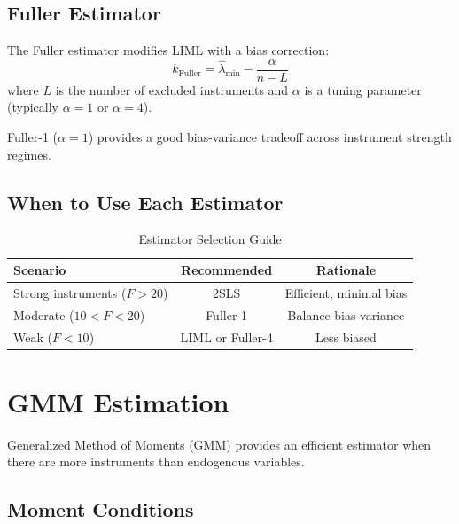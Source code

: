\subsection{Fuller Estimator}

\begin{definition}
\label{def:fuller}
The Fuller estimator modifies LIML with a bias correction:
\begin{equation}
k_{\text{Fuller}} = \hat{\lambda}_{\min} - \frac{\alpha}{n - L}
\end{equation}
where $L$ is the number of excluded instruments and $\alpha$ is a tuning parameter (typically $\alpha = 1$ or $\alpha = 4$).
\end{definition}

Fuller-1 ($\alpha = 1$) provides a good bias-variance tradeoff across instrument strength regimes.

\subsection{When to Use Each Estimator}

\begin{table}[ht]
\centering
\caption{Estimator Selection Guide}
\begin{tabular}{lcc}
\toprule
\textbf{Scenario} & \textbf{Recommended} & \textbf{Rationale} \\
\midrule
Strong instruments ($F > 20$) & 2SLS & Efficient, minimal bias \\
Moderate ($10 < F < 20$) & Fuller-1 & Balance bias-variance \\
Weak ($F < 10$) & LIML or Fuller-4 & Less biased \\
\bottomrule
\end{tabular}
\end{table}


\section{GMM Estimation}
\label{sec:iv_gmm}

Generalized Method of Moments (GMM) provides an efficient estimator when there are more instruments than endogenous variables.

\subsection{Moment Conditions}

